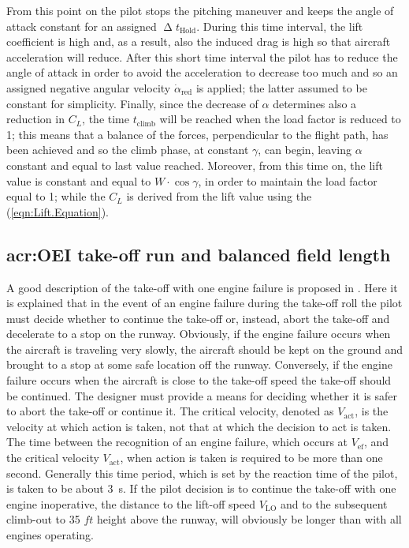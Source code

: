 \bigskip
\noindent
From this point on the pilot stops the pitching maneuver and keeps the angle of attack constant for an assigned $\upDelta t_{\text{Hold}}$. During this time interval, the lift coefficient is high and, as a result, also the induced drag is high so that aircraft acceleration will reduce. 
%
After this short time interval the pilot has to reduce the angle of attack in order to avoid the acceleration to decrease too much and so an assigned negative angular velocity $\dot\alpha_{\text{red}}$ is applied; the latter assumed to be constant for simplicity. 
%
Finally, since the decrease of $\alpha$ determines also a reduction in $C_L$, the time $t_{\text{climb}}$ will be reached when the load factor is reduced to 1; this means that a balance of the forces, perpendicular to the flight path, has been achieved and so the climb phase, at constant $\gamma$, can begin, leaving $\alpha$ constant and equal to last value reached. Moreover, from this time on, the lift value is constant and equal to $W\cdot\cos\gamma$, in order to maintain the load factor equal to 1; while the $C_L$ is derived from the lift value using the (\ref{eqn:Lift.Equation}).
%
\subsection{\gls{acr:OEI} take-off run and balanced field length}
\label{subpar:OEI}
A good description of the take-off with one engine failure is proposed in \cite{sforza2014commercial}. Here it is explained that in the event of an engine failure during the take-off roll the pilot must decide whether to continue the take-off or, instead, abort the take-off and decelerate to a stop on the runway. Obviously, if the engine failure occurs when the aircraft is traveling very slowly, the aircraft should be kept on the ground and brought to a stop at some safe location off the runway. Conversely, if the engine failure occurs when the aircraft is close to the take-off speed the take-off should be continued. The designer must provide a means for deciding whether it is safer to abort the take-off or continue it.
%
The critical velocity, denoted as $V_{\text{act}}$, is the velocity at which action is taken, not that at which the decision to act is taken. The time between the recognition of an engine failure, which occurs at $V_{\text{ef}}$, and the critical velocity $V_{\text{act}}$, when action is taken is required to be more than one second. Generally this time period, which is set by the reaction time of the pilot, is taken to be about \SI{3}{\second}. If the pilot decision is to continue the take-off with one engine inoperative, the distance to the lift-off speed $V_{\text{LO}}$ and to the subsequent climb-out to 35 $\si{ft}$ height above the runway, will obviously be longer than with all engines operating.

